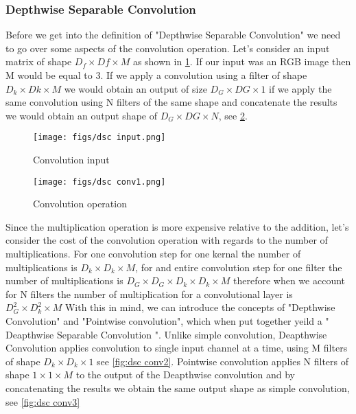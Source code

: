 \subsubsection{Depthwise Separable Convolution}
Before we get into the definition of "Depthwise Separable Convolution" we need to go over some aspects of the convolution operation. Let's consider an input matrix of shape $D_{f} \times D{f} \times M $ as shown in \cref{fig:dsc input}. If our input was an RGB image then M would be equal to 3. If we apply a convolution using a filter of shape $D_{k} \times D{k} \times M $ we would obtain an output of size $D_{G} \times D{G} \times 1 $ if we apply the same convolution using N filters of the same shape and concatenate the results we would obtain an output shape of $D_{G} \times D{G} \times N $, see \cref{fig:dsc conv1}.

\begin{figure}[ht]
	\centering
	\texttt{[image: figs/dsc input.png]}
	\caption{Convolution input }\label{fig:dsc input}
\end{figure}

\begin{figure}[ht]
	\centering
	\texttt{[image: figs/dsc conv1.png]}
	\caption{Convolution operation }\label{fig:dsc conv1}
\end{figure}

Since the multiplication operation is more expensive relative to the addition, let's consider the cost of the convolution operation with regards to the number of multiplications. For one convolution step for one kernal the number of multiplications is $D_{k} \times D_{k} \times M $, for and entire convolution step for one filter the number of multiplications is $D_{G} \times D_{G} \times D_{k} \times D_{k} \times M $ therefore when we account for N filters the number of multiplication for a convolutional layer is $D_{G}^{2} \times D_{k}^{2} \times M $
With this in mind, we can introduce the concepts of "Depthwise Convolution" and "Pointwise convolution", which when put together yeild a " Deapthwise Separable Convolution ". Unlike simple convolution, Deapthwise Convolution applies convolution to single input channel at a time, using M filters of shape  $D_{k} \times D_{k} \times 1 $ see \cref{fig:dsc conv2}. Pointwise convolution applies N filters of shape $1 \times 1 \times M $ to the output of the Deapthwise convolution and by concatenating the results we obtain the same output shape as simple convolution, see \cref{fig:dsc conv3}

